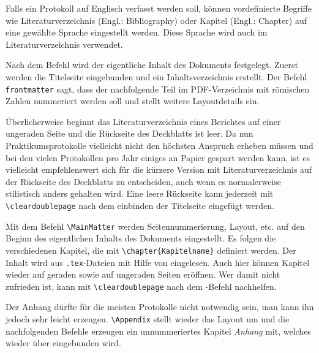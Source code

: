 Falls ein Protokoll auf Englisch verfasst werden soll, können vordefinierte Begriffe wie Literaturverzeichnis (Engl.: Bibliography) oder Kapitel (Engl.: Chapter) auf eine gewählte Sprache eingestellt werden. Diese Sprache wird auch im Literaturverzeichnis verwendet.

Nach dem Befehl \verb|| wird der eigentliche Inhalt des Dokuments festgelegt. Zuerst werden die Titelseite eingebunden und ein Inhaltsverzeichnis erstellt. Der Befehl \verb|frontmatter| sagt, dass der nachfolgende Teil im PDF-Verzeichnis mit römischen Zahlen nummeriert werden soll und stellt weitere Layoutdetails ein.

Überlicherweise beginnt das Literaturverzeichnis eines Berichtes auf einer ungeraden Seite und die Rückseite des Deckblatts ist leer. Da nun Praktikumsprotokolle vielleicht nicht den höchsten Anspruch erheben müssen und bei den vielen Protokollen pro Jahr einiges an Papier gespart werden kann, ist es vielleicht empfehlenswert sich für die kürzere Version mit Literaturverzeichnis auf der Rückseite des Deckblatts zu entscheiden, auch wenn es normalerweise stilistisch anders gehalten wird. Eine leere Rückseite kann jederzeit mit \verb|\cleardoublepage| nach dem einbinden der Titelseite eingefügt werden.

Mit dem Befehl \verb|\MainMatter| werden Seitennummerierung, Layout, etc. auf den Beginn des eigentlichen Inhalts des Dokuments eingestellt. Es folgen die verschiedenen Kapitel, die mit \verb|\chapter{Kapitelname}| definiert werden. Der Inhalt wird aus \verb|.tex|-Dateien mit Hilfe von \verb|| eingelesen. Auch hier können Kapitel wieder auf geraden sowie auf ungeraden Seiten eröffnen. Wer damit nicht zufrieden ist, kann mit \verb|\cleardoublepage| nach dem \verb||-Befehl nachhelfen.

Der Anhang dürfte für die meisten Protokolle nicht notwendig sein, man kann ihn jedoch sehr leicht erzeugen. \verb|\Appendix| stellt wieder das Layout um und die nachfolgenden Befehle erzeugen ein unnummeriertes Kapitel \textit{Anhang} mit, welches wieder über \verb|| eingebunden wird.

